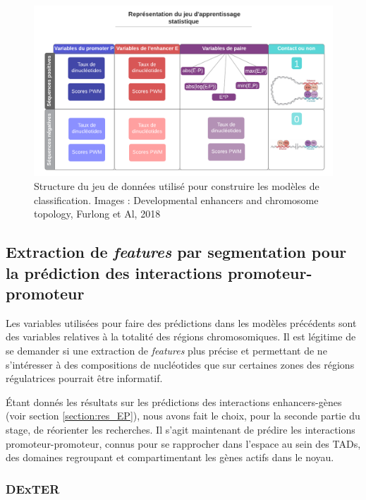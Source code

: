 \documentclass[french]{llncs}
\begin{document}
\begin{figure}[h]
\begin{center}
 	\includegraphics[width=1\linewidth]{Images_FANTOM/Dataset_interactions.png}
 \caption{Structure du jeu de données utilisé pour construire les modèles de classification. Images : Developmental enhancers and chromosome topology, Furlong et Al, 2018 \cite{furlong_developmental_2018}} \label{fig/dataset}
\end{center}
\end{figure}


\subsection{Extraction de \textit{features} par segmentation pour la prédiction des interactions promoteur-promoteur}

Les variables utilisées pour faire des prédictions dans les modèles précédents sont des variables relatives à la totalité des régions chromosomiques. Il est légitime de se demander si une extraction de \textit{features} plus précise et permettant de ne s'intéresser à des compositions de nucléotides que sur certaines zones des régions régulatrices pourrait être informatif.

Étant donnés les résultats sur les prédictions des interactions enhancers-gènes (voir section \ref{section:res_EP}), nous avons fait le choix, pour la seconde partie du stage, de réorienter les recherches. Il s'agit maintenant de prédire les interactions promoteur-promoteur, connus pour se rapprocher dans l'espace au sein des TADs, des domaines regroupant et compartimentant les gènes actifs dans le noyau.

\subsubsection{DExTER}
\end{document}
